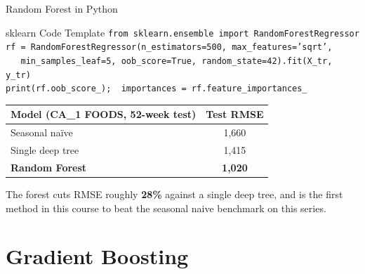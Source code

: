 \documentclass[aspectratio=169, 11pt]{beamer}
\begin{document}
\begin{frame}{Random Forest in Python}
  \begin{examplebox}{sklearn Code Template}
    {\scriptsize
    \texttt{from sklearn.ensemble import RandomForestRegressor}\\
    \texttt{rf = RandomForestRegressor(n\_estimators=500, max\_features='sqrt',}\\
    \texttt{\ \ \ min\_samples\_leaf=5, oob\_score=True, random\_state=42).fit(X\_tr, y\_tr)}\\
    \texttt{print(rf.oob\_score\_);\ \ importances = rf.feature\_importances\_}
    }
  \end{examplebox}
  \begin{center}
    {\footnotesize
    \begin{tabular}{lc}
      \toprule
      \textbf{Model (CA\_1 FOODS, 52-week test)} & \textbf{Test RMSE} \\
      \midrule
      Seasonal na\"{i}ve   & 1,660 \\
      Single deep tree     & 1,415 \\
      \textbf{Random Forest} & \textbf{1,020} \\
      \bottomrule
    \end{tabular}
    }
  \end{center}

  The forest cuts RMSE roughly \textbf{28\%} against a single deep tree, and is the first
  method in this course to beat the seasonal naive benchmark on this series.

\end{frame}

\section{Gradient Boosting}

\end{document}
